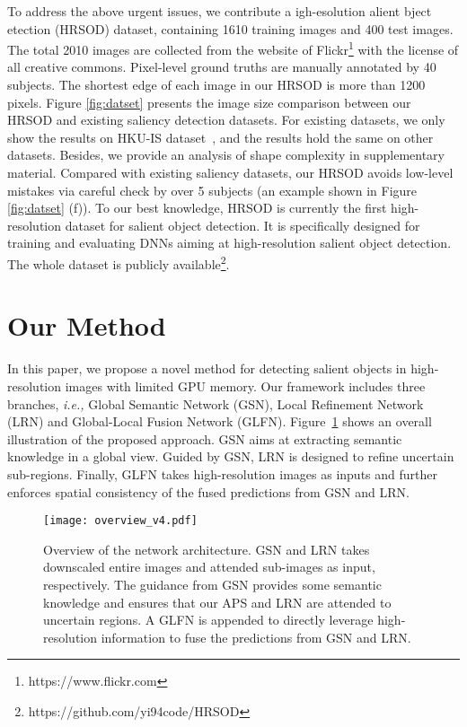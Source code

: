 \documentclass[10pt,twocolumn,letterpaper]{article}
\begin{document}
To address the above urgent issues, we contribute a igh-esolution alient bject etection (HRSOD) dataset, containing 1610 training images and 400 test images. The total 2010 images are collected from the website of Flickr\footnote{https://www.flickr.com} with the license of all creative commons. Pixel-level ground truths are manually annotated by 40 subjects. The shortest edge of each image in our HRSOD is more than 1200 pixels. Figure \ref{fig:datset} presents the image size comparison between our HRSOD and existing saliency detection datasets. For existing datasets, we only show the results on HKU-IS dataset~\cite{li2015visual}, and the results hold the same on other datasets. Besides, we provide an analysis of shape complexity in supplementary material. Compared with existing saliency datasets, our HRSOD avoids low-level mistakes via careful check by over 5 subjects (an example shown in Figure \ref{fig:datset} (f)). To our best knowledge, HRSOD is currently the first high-resolution dataset for salient
object detection. It is specifically designed for training and evaluating DNNs aiming at high-resolution salient object detection. The whole dataset is publicly available\footnote{https://github.com/yi94code/HRSOD}.
\section{Our Method}
In this paper, we propose a novel method for detecting salient objects in high-resolution images with limited GPU memory. Our framework includes three branches, \emph{i.e.,} Global Semantic Network (GSN), Local Refinement Network (LRN) and Global-Local Fusion Network (GLFN). Figure~\ref{overview} shows an overall illustration of the proposed approach. GSN aims at extracting semantic knowledge in a global view. Guided by GSN, LRN is designed to refine uncertain sub-regions. Finally, GLFN takes high-resolution images as inputs and further enforces spatial consistency of the fused predictions from GSN and LRN.
\begin{figure}[!t]
  \centering
\texttt{[image: overview\_v4.pdf]}\\
  \caption{Overview of the network architecture. GSN and LRN takes downscaled entire images and attended sub-images as input, respectively. The guidance from GSN provides some semantic knowledge and ensures that our APS and LRN are attended to uncertain regions. A GLFN is appended to directly leverage high-resolution information to fuse the predictions from GSN and LRN.}\label{overview}\vspace{-4mm}
\end{figure}
\end{document}
